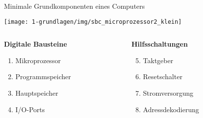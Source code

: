 {

    \begin{frame}[plain]
    \end{frame}
}

\begin{frame}{Minimale Grundkomponenten eines Computers}
    \begin{center}
        \texttt{[image: 1-grundlagen/img/sbc\_microprozessor2\_klein]}
    \end{center}

    \medskip

    \begin{columns}
        \begin{column}[T]{.5\textwidth}
            \textbf{Digitale Bausteine}
            \begin{enumerate}
                \item Mikroprozessor
                \item Programmspeicher
                \item Hauptspeicher
                \item I/O-Ports
            \end{enumerate}
        \end{column}
        \begin{column}[T]{.5\textwidth}
            \textbf{Hilfsschaltungen}
            \begin{enumerate}
                \setcounter{enumi}{4}
                \item Taktgeber
                \item Resetschalter
                \item Stromversorgung
                \item Adressdekodierung
            \end{enumerate}
        \end{column}
    \end{columns}
\end{frame}

